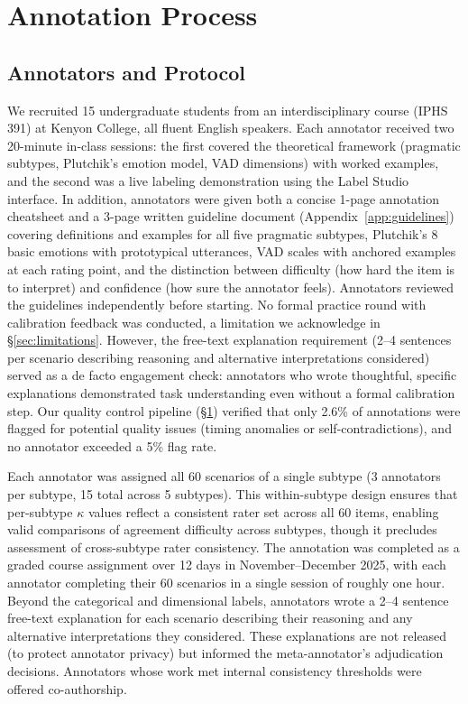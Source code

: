 \documentclass[twoside,11pt]{article}
\begin{document}
\section{Annotation Process}
\label{sec:annotation}

\subsection{Annotators and Protocol}

We recruited 15 undergraduate students from an interdisciplinary course (IPHS 391) at Kenyon College, all fluent English speakers. Each annotator received two 20-minute in-class sessions: the first covered the theoretical framework (pragmatic subtypes, Plutchik's emotion model, VAD dimensions) with worked examples, and the second was a live labeling demonstration using the Label Studio interface. In addition, annotators were given both a concise 1-page annotation cheatsheet and a 3-page written guideline document (Appendix~\ref{app:guidelines}) covering definitions and examples for all five pragmatic subtypes, Plutchik's 8 basic emotions with prototypical utterances, VAD scales with anchored examples at each rating point, and the distinction between difficulty (how hard the item is to interpret) and confidence (how sure the annotator feels). Annotators reviewed the guidelines independently before starting. No formal practice round with calibration feedback was conducted, a limitation we acknowledge in \S\ref{sec:limitations}. However, the free-text explanation requirement (2--4 sentences per scenario describing reasoning and alternative interpretations considered) served as a de facto engagement check: annotators who wrote thoughtful, specific explanations demonstrated task understanding even without a formal calibration step. Our quality control pipeline (\S\ref{sec:annotation}) verified that only 2.6\% of annotations were flagged for potential quality issues (timing anomalies or self-contradictions), and no annotator exceeded a 5\% flag rate.

Each annotator was assigned all 60 scenarios of a single subtype (3 annotators per subtype, 15 total across 5 subtypes). This within-subtype design ensures that per-subtype $\kappa$ values reflect a consistent rater set across all 60 items, enabling valid comparisons of agreement difficulty across subtypes, though it precludes assessment of cross-subtype rater consistency. The annotation was completed as a graded course assignment over 12 days in November--December 2025, with each annotator completing their 60 scenarios in a single session of roughly one hour. Beyond the categorical and dimensional labels, annotators wrote a 2--4 sentence free-text explanation for each scenario describing their reasoning and any alternative interpretations they considered. These explanations are not released (to protect annotator privacy) but informed the meta-annotator's adjudication decisions. Annotators whose work met internal consistency thresholds were offered co-authorship.
\end{document}
